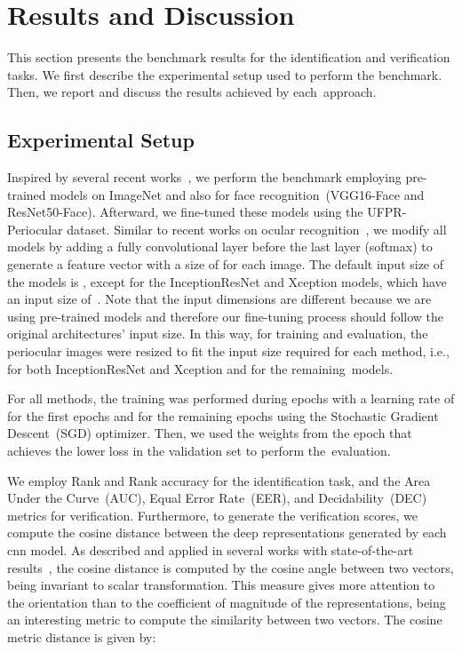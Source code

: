 \section{Results and Discussion}
\label{sec:results}

This section presents the benchmark results for the identification and verification tasks.
We first describe the experimental setup used to perform the benchmark.
Then, we report and discuss the results achieved by each~approach.

\subsection{Experimental Setup}

Inspired by several recent works~\cite{Luz2018, zanlorensi2018impact, reddy2018comparison, wang2019cross, boyd2019fine, zanlorensi2020deep, boutros2020fusing, diaz2020spectrum, hern2020crossspectral}, we perform the benchmark employing pre-trained models on ImageNet and also for face recognition~(VGG16-Face and ResNet50-Face).
Afterward, we fine-tuned these models using the UFPR-Periocular dataset.
Similar to recent works on ocular recognition~\cite{Luz2018, zanlorensi2018impact, silva2018multimodal, zanlorensi2019ocular}, we modify all models by adding a fully convolutional layer before the last layer (softmax) to generate a feature vector with a size of  for each image.
The default input size of the models is , except for the InceptionResNet and Xception models, which have an input size of~. 
Note that the input dimensions are different because we are using pre-trained models and therefore our fine-tuning process should follow the original architectures' input size.
In this way, for training and evaluation, the periocular images were resized to fit the input size required for each method, i.e.,  for both InceptionResNet and Xception and  for the remaining~models. 

For all methods, the training was performed during  epochs with a learning rate of  for the first  epochs and  for the remaining epochs using the Stochastic Gradient Descent~(SGD) optimizer.
Then, we used the weights from the epoch that achieves the lower loss in the validation set to perform the~evaluation.

We employ Rank  and Rank  accuracy for the identification task, and the Area Under the Curve~(AUC), Equal Error Rate~(EER), and Decidability~(DEC) metrics for verification.
Furthermore, to generate the verification scores, we compute the cosine distance between the deep representations generated by each \gls*{cnn} model.
As described and applied in several works with state-of-the-art results~\cite{Luz2018, zanlorensi2018impact, zanlorensi2020deep, zanlorensi2020attnormalization}, the cosine distance is computed by the cosine angle between two vectors, being invariant to scalar transformation.
This measure gives more attention to the orientation than to the coefficient of magnitude of the representations, being an interesting metric to compute the similarity between two vectors.
The cosine metric distance is given by:

